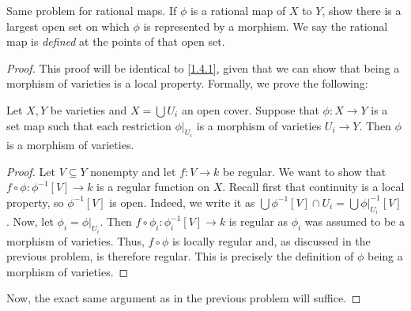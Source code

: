 \label{1.4.2}

Same problem for rational maps. If $\phi$ is a rational map of $X$ to $Y$, show there is a largest open set on which $\phi$ is represented by a morphism. We say the rational map is \emph{defined} at the points of that open set.

\begin{proof}
    This proof will be identical to \ref{1.4.1}, given that we can show that being a morphism of varieties is a local property. Formally, we prove the following:

    \begin{lemma}
        Let $X, Y$ be varieties and $X = \bigcup U_i$ an open cover. Suppose that $\phi: X \longrightarrow Y$ is a set map such that each restriction $\phi|_{U_i}$ is a morphism of varieties $U_i \longrightarrow Y$. Then $\phi$ is a morphism of varieties.
    \end{lemma}
    \begin{proof}
        Let $V \subseteq Y$ nonempty and let $f: V \longrightarrow k$ be regular. We want to show that $f \circ \phi: \phi^{-1}[V] \longrightarrow k$ is a regular function on $X$. Recall first that continuity is a local property, so $\phi^{-1}[V]$ is open. Indeed, we write it as $\bigcup \phi^{-1}[V] \cap U_i = \bigcup \phi|_{U_i}^{-1}[V]$. Now, let $\phi_i = \phi|_{U_i}$. Then $f \circ \phi_i: \phi_i^{-1}[V] \longrightarrow k$ is regular as $\phi_i$ was assumed to be a morphism of varieties. Thus, $f \circ \phi$ is locally regular and, as discussed in the previous problem, is therefore regular. This is precisely the definition of $\phi$ being a morphism of varieties.
    \end{proof}

    Now, the exact same argument as in the previous problem will suffice.
\end{proof}
